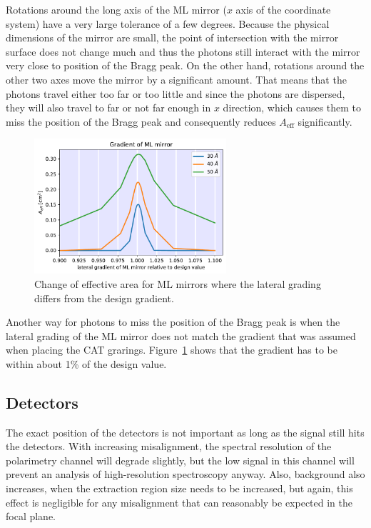 \documentclass[]{spie}  %
\begin{document}
Rotations around the long axis of the ML mirror ($x$ axis of the coordinate system) have a very large tolerance of a few degrees. Because the physical dimensions of the mirror are small, the point of intersection with the mirror surface does not change much and thus the photons still interact with the mirror very close to position of the Bragg peak. On the other hand, rotations around the other two axes move the mirror by a significant amount. That means that the photons travel either too far or too little and since the photons are dispersed, they will also travel to far or not far enough in $x$ direction, which causes them to miss the position of the Bragg peak and consequently reduces $A_{\mathrm{eff}}$ significantly.

\begin{figure} [ht]
  \begin{center}
    \includegraphics[height=5cm]{LGML_gradient.pdf}
  \end{center}
  \caption
      { \label{fig:LGML_gradient}Change of effective area for ML mirrors where the lateral grading differs from the design gradient.
}
\end{figure}

Another way for photons to miss the position of the Bragg peak is when the lateral grading of the ML mirror does not match the gradient that was assumed when placing the CAT grarings. Figure~\ref{fig:LGML_gradient} shows that the gradient has to be within about 1\% of the design value.

\subsection{Detectors}
The exact position of the detectors is not important as long as the signal still hits the detectors. With increasing misalignment, the spectral resolution of the polarimetry channel will degrade slightly, but the low signal in this channel will prevent an analysis of high-resolution spectroscopy anyway. Also, background also increases, when the extraction region size needs to be increased, but again, this effect is negligible for any misalignment that can reasonably be expected in the focal plane.
\end{document}
